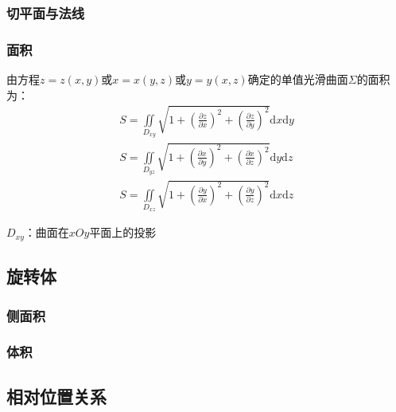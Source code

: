 \documentclass[12pt]{book}
\begin{document}
\subsubsection{切平面与法线}


\subsubsection{面积}



由方程$z=z(x,y)$或$x=x(y,z)$或$y=y(x,z)$确定的单值光滑曲面$\Sigma$的面积为：
\begin{gather*}
    S = \iint\limits_{D_{xy}}{ \sqrt{1+\left(\frac{\partial z}{\partial x}\right)^2+\left(\frac{\partial z}{\partial y}\right)^2} \mathrm{d}x\mathrm{d}y} \\
    S = \iint\limits_{D_{yz}}{ \sqrt{1+\left(\frac{\partial x}{\partial y}\right)^2+\left(\frac{\partial x}{\partial z}\right)^2} \mathrm{d}y\mathrm{d}z}\\
    S = \iint\limits_{D_{xz}}{ \sqrt{1+\left(\frac{\partial y}{\partial x}\right)^2+\left(\frac{\partial y}{\partial z}\right)^2} \mathrm{d}x\mathrm{d}z}
\end{gather*}
\par $D_{xy}$：曲面在$xOy$平面上的投影














\subsection{旋转体}



\subsubsection{侧面积}



\subsubsection{体积}



\subsection{相对位置关系}
\end{document}
